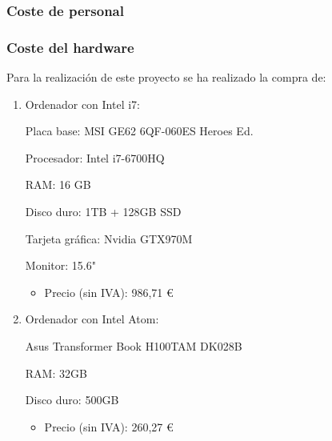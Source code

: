 \documentclass[12pt,a4paper,onecolumn,oneside]{report}
\begin{document}
\subsubsection{Coste de personal}

\begin{table}[ht]
	\centering
	\caption{Presupuesto de personal}
	\label{tabla2}
\end{table}


\subsubsection{Coste del hardware}

Para la realización de este proyecto se ha realizado la compra de:

\begin{enumerate}
	
	\item Ordenador con Intel i7:
	
	Placa base: MSI GE62 6QF-060ES Heroes Ed.
	
	Procesador: Intel i7-6700HQ
	
	RAM: 16 GB
	
	Disco duro: 1TB + 128GB SSD
	
	Tarjeta gráfica: Nvidia GTX970M
	
	Monitor: 15.6"
	
	\begin{itemize}
		\item Precio (sin IVA): 986,71 \euro\\
	\end{itemize}
	
	\item Ordenador con Intel Atom:
	
	Asus Transformer Book H100TAM DK028B
	
	RAM: 32GB
	
	Disco duro: 500GB
	
	\begin{itemize}
		\item Precio (sin IVA): 260,27 \euro
	\end{itemize}
	
\end{enumerate}
\end{document}
